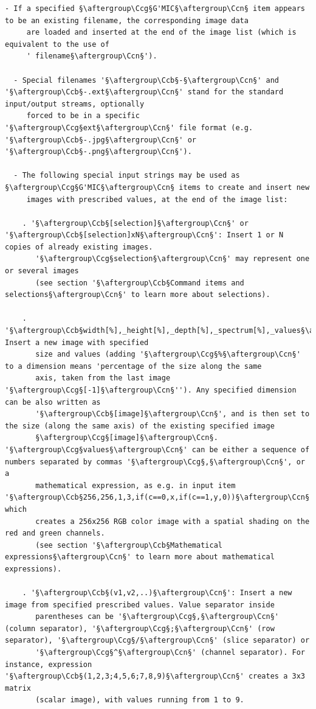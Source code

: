 \documentclass[a4paper,10.5pt,twoside]{book}
\def\Ccb{\color{cb}}
\def\Ccg{\color{cc}}
\def\Ccn{\color{black}}
\begin{document}
\small
\begin{lstlisting}[escapechar=§]
  - If a specified §\aftergroup\Ccg§G'MIC§\aftergroup\Ccn§ item appears to be an existing filename, the corresponding image data 
     are loaded and inserted at the end of the image list (which is equivalent to the use of 
     ' filename§\aftergroup\Ccn§'). 
 
  - Special filenames '§\aftergroup\Ccb§-§\aftergroup\Ccn§' and '§\aftergroup\Ccb§-.ext§\aftergroup\Ccn§' stand for the standard input/output streams, optionally 
     forced to be in a specific '§\aftergroup\Ccg§ext§\aftergroup\Ccn§' file format (e.g. '§\aftergroup\Ccb§-.jpg§\aftergroup\Ccn§' or '§\aftergroup\Ccb§-.png§\aftergroup\Ccn§'). 
 
  - The following special input strings may be used as §\aftergroup\Ccg§G'MIC§\aftergroup\Ccn§ items to create and insert new 
     images with prescribed values, at the end of the image list: 
 
    . '§\aftergroup\Ccb§[selection]§\aftergroup\Ccn§' or '§\aftergroup\Ccb§[selection]xN§\aftergroup\Ccn§': Insert 1 or N copies of already existing images. 
       '§\aftergroup\Ccg§selection§\aftergroup\Ccn§' may represent one or several images 
       (see section '§\aftergroup\Ccb§Command items and selections§\aftergroup\Ccn§' to learn more about selections). 
 
    . '§\aftergroup\Ccb§width[%],_height[%],_depth[%],_spectrum[%],_values§\aftergroup\Ccn§': Insert a new image with specified 
       size and values (adding '§\aftergroup\Ccg§%§\aftergroup\Ccn§' to a dimension means 'percentage of the size along the same 
       axis, taken from the last image '§\aftergroup\Ccg§[-1]§\aftergroup\Ccn§''). Any specified dimension can be also written as 
       '§\aftergroup\Ccb§[image]§\aftergroup\Ccn§', and is then set to the size (along the same axis) of the existing specified image 
       §\aftergroup\Ccg§[image]§\aftergroup\Ccn§. '§\aftergroup\Ccg§values§\aftergroup\Ccn§' can be either a sequence of numbers separated by commas '§\aftergroup\Ccg§,§\aftergroup\Ccn§', or a 
       mathematical expression, as e.g. in input item '§\aftergroup\Ccb§256,256,1,3,if(c==0,x,if(c==1,y,0))§\aftergroup\Ccn§' which 
       creates a 256x256 RGB color image with a spatial shading on the red and green channels. 
       (see section '§\aftergroup\Ccb§Mathematical expressions§\aftergroup\Ccn§' to learn more about mathematical expressions). 
 
    . '§\aftergroup\Ccb§(v1,v2,..)§\aftergroup\Ccn§': Insert a new image from specified prescribed values. Value separator inside 
       parentheses can be '§\aftergroup\Ccg§,§\aftergroup\Ccn§' (column separator), '§\aftergroup\Ccg§;§\aftergroup\Ccn§' (row separator), '§\aftergroup\Ccg§/§\aftergroup\Ccn§' (slice separator) or 
       '§\aftergroup\Ccg§^§\aftergroup\Ccn§' (channel separator). For instance, expression '§\aftergroup\Ccb§(1,2,3;4,5,6;7,8,9)§\aftergroup\Ccn§' creates a 3x3 matrix 
       (scalar image), with values running from 1 to 9. 
 

\end{lstlisting}
\end{document}
